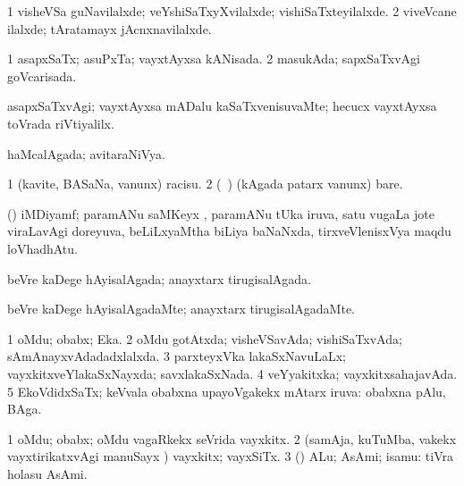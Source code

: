 \bentry
{}
\gl{\kirxvi}
\bmng
\bnum
\num{1} visheVSa guNavilalxde; veYshiSaTxyXvilalxde; vishiSaTxteyilalxde. 
\num{2} viveVcane ilalxde; tAratamayx jAcnxnavilalxde. 
\enum
\emng
\eentry

\bentry
{}
\gl{\gu}
\bmng
\bnum
\num{1} asapxSaTx; asuPxTa; vayxtAyxsa kANisada. 
\num{2} masukAda; sapxSaTxvAgi goVcarisada. 
\enum
\emng
\eentry

\bentry
{}
\gl{\kirxvi}
\bmng
asapxSaTxvAgi; vayxtAyxsa mADalu kaSaTxvenisuvaMte; hecucx vayxtAyxsa toVrada riVtiyalilx. 
\emng
\eentry

\bentry
{}
\gl{\gu}
\bmng
haMcalAgada; avitaraNiVya. 
\emng
\eentry

\bentry
{}
\gl{\sakirx}
\bmng
\bnum
\num{1} (kavite, BASaNa, \mo vanunx) racisu. 
\num{2} (\sA\ \hA) (kAgada patarx \mo vanunx) bare. 
\enum
\emng
\eentry

\bentry
{}
\gl{\nA}
\bmng
(\ravi) iMDiyamf; paramANu saMKeyx , paramANu tUka  iruva, satu \mo vugaLa jote viraLavAgi doreyuva, beLiLxyaMtha biLiya baNaNxda, tirxveVlenisxVya maqdu loVhadhAtu. 
\emng
\eentry

\bentry
{}
\gl{\gu}
\bmng
beVre kaDege hAyisalAgada; anayxtarx tirugisalAgada. 
\emng
\eentry

\bentry
{}
\gl{\kirxvi}
\bmng
beVre kaDege hAyisalAgadaMte; anayxtarx tirugisalAgadaMte. 
\emng
\eentry

\bentry
{}
\gl{\gu}
\bmng
\bnum
\num{1} oMdu; obabx; Eka. 
\num{2} oMdu gotAtxda; visheVSavAda; vishiSaTxvAda; sAmAnayxvAdadadxlalxda. 
\num{3} parxteyxVka lakaSxNavuLaLx; vayxkitxveYlakaSxNayxda; savxlakaSxNada. 
\num{4} veYyakitxka; vayxkitxsahajavAda. 
\num{5} EkoVdidxSaTx; keVvala obabxna upayoVgakekx mAtarx iruva:  obabxna pAlu, BAga. 
\enum
\emng
\eentry

\bentry
{}
\gl{\nA}
\bmng
\bnum
\num{1} oMdu; obabx; oMdu vagaRkekx seVrida vayxkitx. 
\num{2} (samAja, kuTuMba, \mo vakekx vayxtirikatxvAgi manuSayx \mo) vayxkitx; vayxSiTx. 
\num{3} (\AmA) ALu; AsAmi; isamu:  tiVra holasu AsAmi. 
\enum
\emng
\eentry

